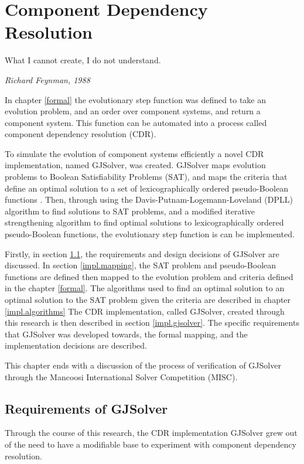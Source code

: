 \chapter{Component Dependency Resolution}
\label{implementation}
\epigraph{What I cannot create, I do not understand.}
{\textit{Richard Feynman, 1988}}

In chapter \ref{formal} the evolutionary step function was defined to take an evolution problem, and an order over component systems, 
and return a component system.
This function can be automated into a process called component dependency resolution (CDR).

To simulate the evolution of component systems efficiently a novel CDR implementation, named GJSolver, was created.
GJSolver maps evolution problems to Boolean Satisfiability Problems (SAT),
and maps the criteria that define an optimal solution to a set of lexicographically ordered pseudo-Boolean functions \citep{dixon2004automating}. 
Then, through using the Davis-Putnam-Logemann-Loveland (DPLL) algorithm \citep{Davis1960, davis1962machine} to find solutions to SAT problems,
and a modified iterative strengthening algorithm \citep{calistri1994iterative, le2010sat4j} to find optimal solutions to lexicographically ordered pseudo-Boolean functions,
the evolutionary step function is can be implemented.

Firstly, in section \ref{impl.requirement}, the requirements and design decisions of GJSolver are discussed.
In section \ref{impl.mapping}, the SAT problem and pseudo-Boolean functions are defined then mapped to the evolution problem and criteria defined in the chapter \ref{formal}.
The algorithms used to find an optimal solution to an optimal solution to the SAT problem given the criteria are described in chapter \ref{impl.algorithms}
The CDR implementation, called GJSolver, created through this research is then described in section \ref{impl.gjsolver}.
The specific requirements that GJSolver was developed towards, the formal mapping, and the implementation decisions are described.

This chapter ends with a discussion of the process of verification of GJSolver through the Mancoosi International Solver Competition (MISC).  

\section{Requirements of GJSolver}
\label{impl.requirement}
Through the course of this research, the CDR implementation GJSolver grew out of the need to have a modifiable base to experiment with component dependency resolution.


